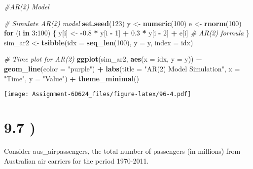 \documentclass[
]{article}
\newenvironment{Shaded}{\begin{snugshade}}{\end{snugshade}}
\newcommand{\AttributeTok}[1]{\textcolor[rgb]{0.13,0.29,0.53}{#1}}
\newcommand{\CommentTok}[1]{\textcolor[rgb]{0.56,0.35,0.01}{\textit{#1}}}
\newcommand{\ControlFlowTok}[1]{\textcolor[rgb]{0.13,0.29,0.53}{\textbf{#1}}}
\newcommand{\DecValTok}[1]{\textcolor[rgb]{0.00,0.00,0.81}{#1}}
\newcommand{\FloatTok}[1]{\textcolor[rgb]{0.00,0.00,0.81}{#1}}
\newcommand{\FunctionTok}[1]{\textcolor[rgb]{0.13,0.29,0.53}{\textbf{#1}}}
\newcommand{\NormalTok}[1]{#1}
\newcommand{\OtherTok}[1]{\textcolor[rgb]{0.56,0.35,0.01}{#1}}
\newcommand{\SpecialCharTok}[1]{\textcolor[rgb]{0.81,0.36,0.00}{\textbf{#1}}}
\newcommand{\StringTok}[1]{\textcolor[rgb]{0.31,0.60,0.02}{#1}}
\begin{document}
\begin{Shaded}
\begin{Highlighting}[]
\CommentTok{\#AR(2) Model}

\CommentTok{\# Simulate AR(2) model}
\FunctionTok{set.seed}\NormalTok{(}\DecValTok{123}\NormalTok{)}
\NormalTok{y }\OtherTok{\textless{}{-}} \FunctionTok{numeric}\NormalTok{(}\DecValTok{100}\NormalTok{)}
\NormalTok{e }\OtherTok{\textless{}{-}} \FunctionTok{rnorm}\NormalTok{(}\DecValTok{100}\NormalTok{)}
\ControlFlowTok{for}\NormalTok{ (i }\ControlFlowTok{in} \DecValTok{3}\SpecialCharTok{:}\DecValTok{100}\NormalTok{) \{}
\NormalTok{  y[i] }\OtherTok{\textless{}{-}} \SpecialCharTok{{-}}\FloatTok{0.8} \SpecialCharTok{*}\NormalTok{ y[i }\SpecialCharTok{{-}} \DecValTok{1}\NormalTok{] }\SpecialCharTok{+} \FloatTok{0.3} \SpecialCharTok{*}\NormalTok{ y[i }\SpecialCharTok{{-}} \DecValTok{2}\NormalTok{] }\SpecialCharTok{+}\NormalTok{ e[i] }\CommentTok{\# AR(2) formula}
\NormalTok{\}}
\NormalTok{sim\_ar2 }\OtherTok{\textless{}{-}} \FunctionTok{tsibble}\NormalTok{(}\AttributeTok{idx =} \FunctionTok{seq\_len}\NormalTok{(}\DecValTok{100}\NormalTok{), }\AttributeTok{y =}\NormalTok{ y, }\AttributeTok{index =}\NormalTok{ idx)}

\CommentTok{\# Time plot for AR(2)}
\FunctionTok{ggplot}\NormalTok{(sim\_ar2, }\FunctionTok{aes}\NormalTok{(}\AttributeTok{x =}\NormalTok{ idx, }\AttributeTok{y =}\NormalTok{ y)) }\SpecialCharTok{+}
  \FunctionTok{geom\_line}\NormalTok{(}\AttributeTok{color =} \StringTok{"purple"}\NormalTok{) }\SpecialCharTok{+}
  \FunctionTok{labs}\NormalTok{(}\AttributeTok{title =} \StringTok{"AR(2) Model Simulation"}\NormalTok{, }\AttributeTok{x =} \StringTok{"Time"}\NormalTok{, }\AttributeTok{y =} \StringTok{"Value"}\NormalTok{) }\SpecialCharTok{+}
  \FunctionTok{theme\_minimal}\NormalTok{()}
\end{Highlighting}
\end{Shaded}

\texttt{[image: Assignment-6D624\_files/figure-latex/96-4.pdf]}

\section{9.7 )}\label{section-5}

Consider aus\_airpassengers, the total number of passengers (in
millions) from Australian air carriers for the period 1970-2011.
\end{document}
